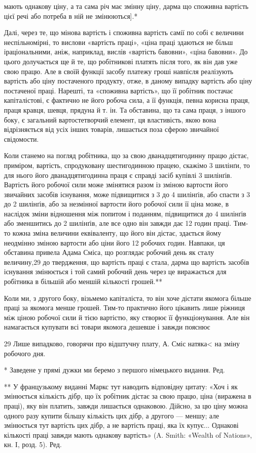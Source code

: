 мають однакову ціну, а та сама річ має змінну ціну, дарма що
споживна вартість цієї речі або потреба в ній не змінюються].*

Далі, через те, що мінова вартість і споживна вартість самії
по собі є величини неспільномірні, то вислови «вартість праці»,
«ціна праці здаються не більш іраціональними, аніж, наприклад,
вислів «вартість бавовни», «ціна бавовни». До цього долучається
ще й те, що робітникові платять після того, як він дав
уже свою працю. Але в своїй функції засобу платежу гроші
навпісля реалізують вартість або ціну постаченого продукту,
отже, в даному випадку вартість або ціну постаченої праці.
Нарешті, та «споживна вартість», що її робітник постачає капіталістові,
є фактично не його робоча сила, а її функція, певна
корисна праця, праця кравця, шевця, прядуна й т. ін. Та обставина,
що та сама праця, з іншого боку, є загальний вартостетворчий
елемент, ця властивість, якою вона відрізняється від усіх
інших товарів, лишається поза сферою звичайної свідомости.

Коли станемо на погляд робітника, що за свою дванадцятигодинну
працю дістає, приміром, вартість, спродуковану шестигодинною
працею, скажімо 3 шилінґи, то для нього його дванадцятигодинна
праця є справді засіб купівлі 3 шилінґів. Вартість
його робочої сили може змінятися разом із зміною вартости його
звичайних засобів існування, може підвищитися з 3 до 4 шилінґів,
або спасти з 3 до 2 шилінґів, або за незмінної вартости його робочої
сили її ціна може, в наслідок зміни відношення між попитом
і поданням, підвищитися до 4 шилінґів або зменшитись до 2 шилінґів,
але все одно він завжди дає 12 годин праці. Тим-то кожна
зміна величини еквіваленту, що його він дістає, здається йому
неодмінно зміною вартости або ціни його 12 робочих годин.
Навпаки, ця обставина привела Адама Сміса, що розглядає
робочий день як сталу величину,29 до твердження, що вартість
праці є стала, дарма що вартість засобів існування змінюється
і той самий робочий день через це виражається для робітника
в більшій або меншій кількості грошей.**

Коли ми, з другого боку, візьмемо капіталіста, то він хоче
дістати якомога більше праці за якомога менше грошей. Тим-то
практично його цікавить лише ріжниця між ціною робочої сили
й тією вартістю, яку створює її функціонування. Але він намагається
купувати всі товари якомога дешевше і завжди пояснює

29 Лише випадково, говорячи про відштучну плату, А. Сміс натяка<
на зміну робочого дня.

* Заведене у прямі дужки ми беремо з першого німецького видання. Ред.

** У французькому виданні Маркс тут наводить відповідну цитату:
«Хоч і як змінюється кількість дібр, що їх робітник дістає за свою
працю, ціна (виражена в праці), яку він платить, завжди лишається
однаковою. Дійсно, за цю ціну можна одного разу купити більшу кількість
цих дібр, а другого — меншу; але змінюється тут вартість цих
дібр, а не вартість праці, яка їх купує... Однакові кількості праці
завжди мають однакову вартість» (A. Smith: «Wealth of Nations», кн. I,
розд. 5). Ред.
